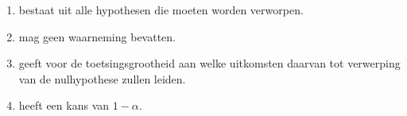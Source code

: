 \begin{enumerate}[label=(\alph*)]
    \item bestaat uit alle hypothesen die moeten worden verworpen.
    \item mag geen waarneming bevatten.
    \item geeft voor de toetsingsgrootheid aan welke uitkomsten daarvan tot verwerping van de nulhypothese zullen leiden.
    \item heeft een kans van $1 - \alpha$.
\end{enumerate}
